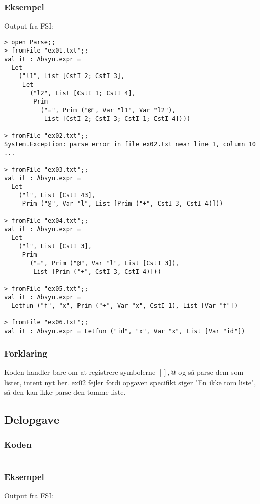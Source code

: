 \subsubsection{Eksempel}
Output fra FSI:
\begin{lstlisting}
> open Parse;;
> fromFile "ex01.txt";;
val it : Absyn.expr =
  Let
    ("l1", List [CstI 2; CstI 3],
     Let
       ("l2", List [CstI 1; CstI 4],
        Prim
          ("=", Prim ("@", Var "l1", Var "l2"),
           List [CstI 2; CstI 3; CstI 1; CstI 4])))

> fromFile "ex02.txt";;
System.Exception: parse error in file ex02.txt near line 1, column 10
...

> fromFile "ex03.txt";;
val it : Absyn.expr =
  Let
    ("l", List [CstI 43],
     Prim ("@", Var "l", List [Prim ("+", CstI 3, CstI 4)]))

> fromFile "ex04.txt";;
val it : Absyn.expr =
  Let
    ("l", List [CstI 3],
     Prim
       ("=", Prim ("@", Var "l", List [CstI 3]),
        List [Prim ("+", CstI 3, CstI 4)]))

> fromFile "ex05.txt";;
val it : Absyn.expr =
  Letfun ("f", "x", Prim ("+", Var "x", CstI 1), List [Var "f"])

> fromFile "ex06.txt";;
val it : Absyn.expr = Letfun ("id", "x", Var "x", List [Var "id"])
\end{lstlisting}

\subsubsection{Forklaring}
Koden handler bare om at registrere symbolerne $[],@$ og så parse dem som lister, intent nyt her. ex02 fejler fordi opgaven specifikt siger "En ikke tom liste", så den kan ikke parse den tomme liste.

\subsection{Delopgave }\label{ass:4-2}
\subsubsection{Koden}
\begin{lstlisting}[language=fsharp]

\end{lstlisting}

\subsubsection{Eksempel}
Output fra FSI:
\begin{lstlisting}

\end{lstlisting}

